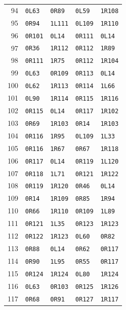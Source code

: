 {\begin{longtable}{rllll}
94 & \texttt{0L63} & \texttt{0R89} & \texttt{0L59} & \texttt{1R108}\\
95 & \texttt{0R94} & \texttt{1L111} & \texttt{0L109} & \texttt{1R110}\\
96 & \texttt{0R101} & \texttt{0L14} & \texttt{0R111} & \texttt{0L14}\\
97 & \texttt{0R36} & \texttt{1R112} & \texttt{0R112} & \texttt{1R89}\\
98 & \texttt{0R111} & \texttt{1R75} & \texttt{0R112} & \texttt{1R104}\\
99 & \texttt{0L63} & \texttt{0R109} & \texttt{0R113} & \texttt{0L14}\\
100 & \texttt{0L62} & \texttt{1R113} & \texttt{0R114} & \texttt{1L66}\\
101 & \texttt{0L90} & \texttt{1R114} & \texttt{0R115} & \texttt{1R116}\\
102 & \texttt{0R115} & \texttt{0L14} & \texttt{0R117} & \texttt{1R102}\\
103 & \texttt{0R69} & \texttt{1R103} & \texttt{0R14} & \texttt{1R103}\\
104 & \texttt{0R116} & \texttt{1R95} & \texttt{0L109} & \texttt{1L33}\\
105 & \texttt{0R116} & \texttt{1R67} & \texttt{0R67} & \texttt{1R118}\\
106 & \texttt{0R117} & \texttt{0L14} & \texttt{0R119} & \texttt{1L120}\\
107 & \texttt{0R118} & \texttt{1L71} & \texttt{0R121} & \texttt{1R122}\\
108 & \texttt{0R119} & \texttt{1R120} & \texttt{0R46} & \texttt{0L14}\\
109 & \texttt{0R14} & \texttt{1R109} & \texttt{0R85} & \texttt{1R94}\\
110 & \texttt{0R66} & \texttt{1R110} & \texttt{0R109} & \texttt{1L89}\\
111 & \texttt{0R121} & \texttt{1L35} & \texttt{0R123} & \texttt{1R123}\\
112 & \texttt{0R122} & \texttt{1R123} & \texttt{0L60} & \texttt{0R82}\\
113 & \texttt{0R88} & \texttt{0L14} & \texttt{0R62} & \texttt{0R117}\\
114 & \texttt{0R90} & \texttt{1L95} & \texttt{0R55} & \texttt{0R117}\\
115 & \texttt{0R124} & \texttt{1R124} & \texttt{0L80} & \texttt{1R124}\\
116 & \texttt{0L63} & \texttt{0R103} & \texttt{0R125} & \texttt{1R126}\\
117 & \texttt{0R68} & \texttt{0R91} & \texttt{0R127} & \texttt{1R117}\\

\end{longtable}}
